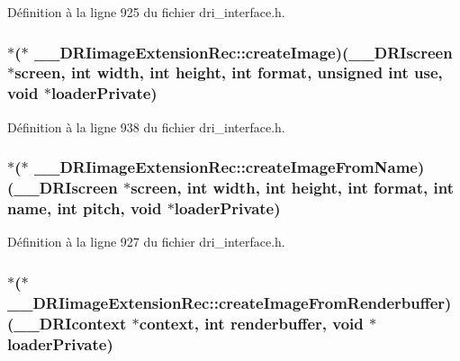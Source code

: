 Définition à la ligne 925 du fichier dri\-\_\-interface.\-h.

\hypertarget{struct_____d_r_iimage_extension_rec_abe2e5f52994ae516b3d83ca5e3dfaa25}{
\subsubsection[{create\-Image}]{$\ast$($\ast$ \-\_\-\-\_\-\-D\-R\-Iimage\-Extension\-Rec\-::create\-Image)({\bf \-\_\-\-\_\-\-D\-R\-Iscreen} $\ast$screen, int {\bf width}, int {\bf height}, int {\bf format}, unsigned int use, {\bf void} $\ast$loader\-Private)}}\label{struct_____d_r_iimage_extension_rec_abe2e5f52994ae516b3d83ca5e3dfaa25}


Définition à la ligne 938 du fichier dri\-\_\-interface.\-h.

\hypertarget{struct_____d_r_iimage_extension_rec_a4b0079557bc9e31cc22e2c676fbeb72d}{
\subsubsection[{create\-Image\-From\-Name}]{$\ast$($\ast$ \-\_\-\-\_\-\-D\-R\-Iimage\-Extension\-Rec\-::create\-Image\-From\-Name)({\bf \-\_\-\-\_\-\-D\-R\-Iscreen} $\ast$screen, int {\bf width}, int {\bf height}, int {\bf format}, int {\bf name}, int pitch, {\bf void} $\ast$loader\-Private)}}\label{struct_____d_r_iimage_extension_rec_a4b0079557bc9e31cc22e2c676fbeb72d}


Définition à la ligne 927 du fichier dri\-\_\-interface.\-h.

\hypertarget{struct_____d_r_iimage_extension_rec_ac33038f1d4d0767dc32ad84525af3c03}{
\subsubsection[{create\-Image\-From\-Renderbuffer}]{$\ast$($\ast$ \-\_\-\-\_\-\-D\-R\-Iimage\-Extension\-Rec\-::create\-Image\-From\-Renderbuffer)({\bf \-\_\-\-\_\-\-D\-R\-Icontext} $\ast$context, int {\bf renderbuffer}, {\bf void} $\ast$loader\-Private)}}\label{struct_____d_r_iimage_extension_rec_ac33038f1d4d0767dc32ad84525af3c03}


